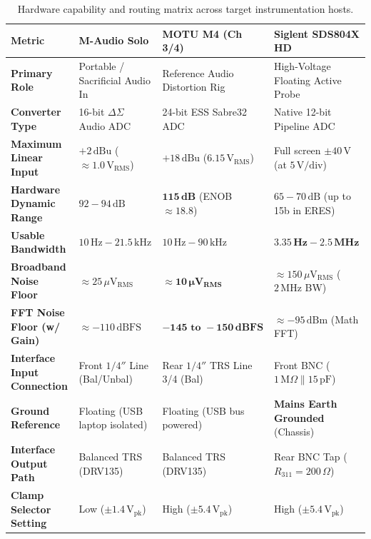\documentclass[11pt, letterpaper]{article}
\begin{document}
\begin{table}[H]
    \centering
    \small
    \setlength{\tabcolsep}{3.5pt}
    \begin{tabularx}{\textwidth}{@{} l L L L @{}}
        \toprule
        \textbf{Metric} & \textbf{M-Audio Solo} & \textbf{MOTU M4 (Ch 3/4)} & \textbf{Siglent SDS804X HD} \\
        \midrule
        \textbf{Primary Role} & Portable / Sacrificial Audio In & Reference Audio Distortion Rig & High-Voltage Floating Active Probe \\
        \textbf{Converter Type} & 16-bit $\Delta\Sigma$ Audio ADC & 24-bit ESS Sabre32 ADC & Native 12-bit Pipeline ADC \\
        \textbf{Maximum Linear Input} & $+2\,\text{dBu}$ ($\approx 1.0\,\text{V}_{\text{RMS}}$) & $+18\,\text{dBu}$ ($6.15\,\text{V}_{\text{RMS}}$) & Full screen $\pm 40\,\text{V}$ (at $5\,\text{V}/\text{div}$) \\
        \textbf{Hardware Dynamic Range} & $92 - 94\,\text{dB}$ & $\mathbf{115\,\text{dB}}$ (ENOB $\approx 18.8$) & $65 - 70\,\text{dB}$ (up to 15b in ERES) \\
        \textbf{Usable Bandwidth} & $10\,\text{Hz} - 21.5\,\text{kHz}$ & $10\,\text{Hz} - 90\,\text{kHz}$ & $\mathbf{3.35\,\text{Hz} - 2.5\,\text{MHz}}$ \\
        \textbf{Broadband Noise Floor} & $\approx 25\,\mu\text{V}_{\text{RMS}}$ & $\mathbf{\approx 10\,\mu\text{V}_{\text{RMS}}}$ & $\approx 150\,\mu\text{V}_{\text{RMS}}$ ($2\,\text{MHz}$ BW) \\
        \textbf{FFT Noise Floor (w/ Gain)}& $\approx -110\,\text{dBFS}$ & $\mathbf{-145\text{ to } -150\,\text{dBFS}}$ & $\approx -95\,\text{dBm}$ (Math FFT) \\
        \textbf{Interface Input Connection}& Front $1/4''$ Line (Bal/Unbal) & Rear $1/4''$ TRS Line 3/4 (Bal) & Front BNC ($1\,\text{M}\Omega \parallel 15\,\text{pF}$) \\
        \textbf{Ground Reference} & Floating (USB laptop isolated) & Floating (USB bus powered) & \textbf{Mains Earth Grounded} (Chassis) \\
        \textbf{Interface Output Path} & Balanced TRS (DRV135) & Balanced TRS (DRV135) & Rear BNC Tap ($R_{311} = 200\,\Omega$) \\
        \textbf{Clamp Selector Setting} & Low ($\pm 1.4\,\text{V}_{\text{pk}}$) & High ($\pm 5.4\,\text{V}_{\text{pk}}$) & High ($\pm 5.4\,\text{V}_{\text{pk}}$) \\
        \bottomrule
    \end{tabularx}
    \caption{Hardware capability and routing matrix across target instrumentation hosts.}
    \label{tab:host_matrix}
\end{table}
\end{document}
